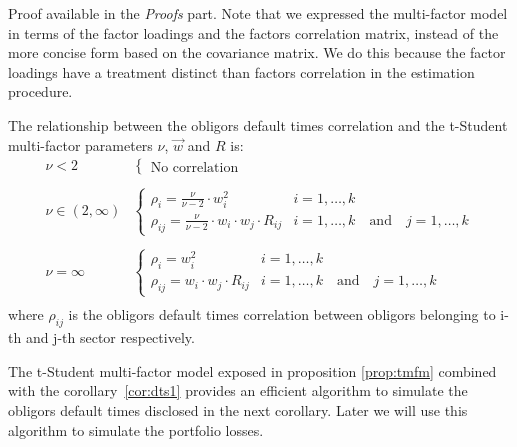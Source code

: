 \documentclass[11pt,fleqn]{book} %
\begin{document}
Proof available in the \emph{Proofs} part.
Note that we expressed the multi-factor model in terms of the factor 
loadings and the factors correlation matrix, instead of the more concise 
form based on the covariance matrix. We do this because the factor loadings 
have a treatment distinct than factors correlation in the estimation procedure.

\begin{corollary}
	\label{cor:rbc}
	The relationship between the obligors default times correlation and the t-Student
	multi-factor parameters $\nu$, $\vec{w}$ and $R$ is:\\
	\begin{displaymath}
		\begin{array}{ll}
			\nu < 2 & \left\{
				\begin{array}{ll}
					\text{No correlation} & 
				\end{array}
			\right. \\
			& \\
			\nu \in (2,\infty) & \left\{
				\begin{array}{ll}
					\rho_i = \frac{\nu}{\nu-2} \cdot w_i^2 & i = 1,\dots,k \\
					\rho_{ij} = \frac{\nu}{\nu-2} \cdot w_i \cdot w_j \cdot R_{ij} & i = 1,\dots,k \quad \text{and} \quad j = 1,\dots,k
				\end{array}
			\right. \\
			& \\
			\nu = \infty & \left\{
				\begin{array}{ll}
					\rho_i = w_i^2 & i = 1,\dots,k \\
					\rho_{ij} = w_i \cdot w_j \cdot R_{ij} & i = 1,\dots,k \quad \text{and} \quad j = 1,\dots,k
				\end{array}
			\right. \\
		\end{array}
	\end{displaymath}
	where $\rho_{ij}$ is the obligors default times correlation between obligors
	belonging to i-th and j-th sector respectively.
\end{corollary}

The t-Student multi-factor model exposed in proposition \ref{prop:tmfm} 
combined with the corollary~\ref{cor:dts1} provides an efficient algorithm 
to simulate the obligors default times disclosed in the next corollary. 
Later we will use this algorithm to simulate the portfolio losses.
\end{document}
